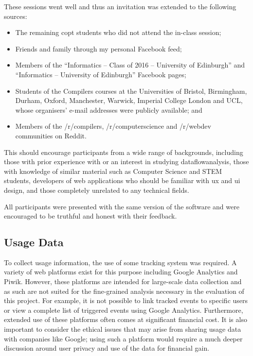 \documentclass[bsc,twoside,singlespacing,parskip,logo,notimes,normalheadings]{infthesis}
\begin{document}
    These sessions went well and thus an invitation was extended to
    the following sources:

    \begin{itemize}
    \item The remaining \gls{copt} students who did not attend the
      in-class session;
    \item Friends and family through my personal Facebook feed;
    \item Members of the ``Informatics -- Class of 2016 --
      University of Edinburgh'' and ``Informatics -- University of
      Edinburgh'' Facebook pages;
    \item Students of the Compilers courses at the Universities of
      Bristol, Birmingham, Durham, Oxford, Manchester, Warwick,
      Imperial College London and UCL, whose organisers' e-mail
      addresses were publicly available; and
    \item Members of the /r/compilers, /r/computerscience and
      /r/webdev communities on Reddit\cite{reddit}.
    \end{itemize}

    This should encourage participants from a wide range of
    backgrounds, including those with prior experience with or an
    interest in studying \gls{dataflowanalysis}, those with knowledge
    of similar material such as Computer Science and STEM students,
    developers of web applications who should be familiar with
    \gls{ux} and \gls{ui} design, and those completely unrelated to
    any technical fields.

    All participants were presented with the same version of the
    software and were encouraged to be truthful and honest with their
    feedback.

        \subsection{Usage Data}
        To collect usage information, the use of some tracking system
        was required. A variety of web platforms exist for this
        purpose including Google Analytics and Piwik. However, these
        platforms are intended for large-scale data collection and as
        such are not suited for the fine-grained analysis necessary in
        the evaluation of this project. For example, it is not
        possible to link tracked events to specific users or view a
        complete list of triggered events using Google
        Analytics. Furthermore, extended use of these platforms often
        comes at significant financial cost. It is also important to
        consider the ethical issues that may arise from sharing usage
        data with companies like Google; using such a platform would
        require a much deeper discussion around user privacy and use
        of the data for financial gain.
\end{document}
